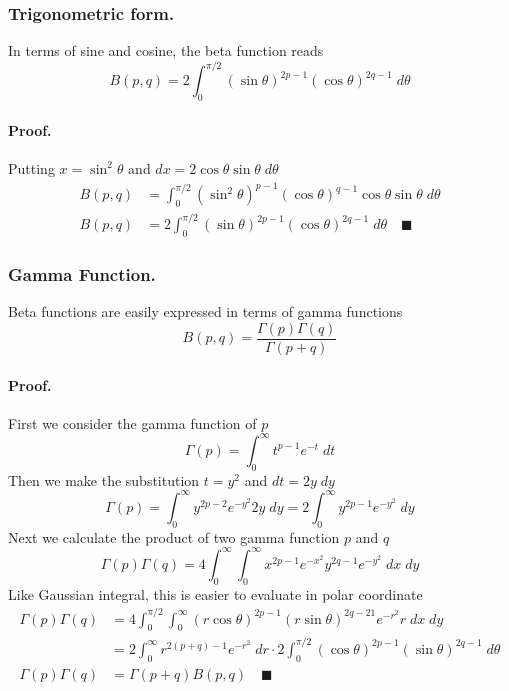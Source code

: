\documentclass[../../main.tex]{subfiles}
\begin{document}
\subsubsection{Trigonometric form.} In terms of sine and cosine, the beta function reads 
\begin{equation*}
    B(p,q)=2\int_{0}^{\pi/2}(\sin \theta)^{2p-1}(\cos\theta)^{2q-1}\;d\theta
\end{equation*}

\paragraph{Proof.} Putting $x=\sin^2\theta$ and $dx=2\cos\theta\sin\theta\;d\theta$
\begin{align*}
    B(p,q)&=\int_{0}^{\pi/2} (\sin^2\theta)^{p-1}(\cos\theta)^{q-1} \cos\theta\sin\theta\;d\theta\\
    B(p,q)&=2\int_{0}^{\pi/2} (\sin \theta)^{2p-1}(\cos\theta)^{2q-1}\;d\theta\quad\blacksquare
\end{align*}

\subsubsection{Gamma Function.}  Beta functions are easily expressed in terms of gamma functions
\begin{equation*}
    B(p,q)=\frac{\Gamma(p)\Gamma(q)}{\Gamma(p+q)}
\end{equation*}

\paragraph{Proof.} First we consider the gamma function of $p$
\begin{equation*}
    \Gamma(p)=\int_{0}^{\infty}t^{p-1}e^{-t}\;dt
\end{equation*}
Then we make the substitution $t=y^2$ and $dt=2y\;dy$
\begin{equation*}
    \Gamma(p)=\int_{0}^{\infty}y^{2p-2}e^{-y^2}2y\;dy=2\int_{0}^{\infty}y^{2p-1}e^{-y^2}\;dy
\end{equation*}
Next we calculate the product of two gamma function $p$ and $q$
\begin{equation*}
    \Gamma(p)\Gamma(q)=4\int_{0}^{\infty}\int_{0}^{\infty} x^{2p-1}e^{-x^2} y^{2q-1}e^{-y^2}\;dx\;dy
\end{equation*}
Like Gaussian integral, this is easier to evaluate in polar coordinate
\begin{align*}
    \Gamma(p)\Gamma(q)&=4\int_{0}^{\pi/2}\int_{0}^{\infty} (r\cos\theta)^{2p-1} (r\sin\theta)^{2q-21}e^{-r^2}r\;dx\;dy\\
    &=2\int_{0}^{\infty}r^{2(p+q)-1}e^{-r^2}\;dr\cdot 2\int_{0}^{\pi/2} (\cos\theta)^{2p-1}(\sin\theta)^{2q-1}\;d\theta\\
    \Gamma(p)\Gamma(q)&=\Gamma(p+q)B(p,q)\quad\blacksquare
\end{align*}
\end{document}
